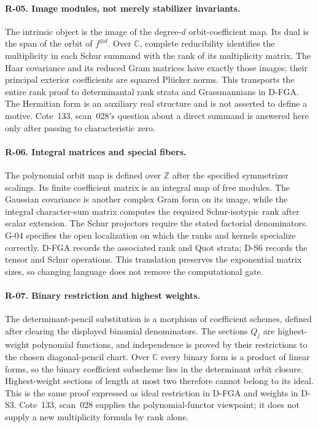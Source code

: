 \paragraph{R-05. Image modules, not merely stabilizer invariants.}
The intrinsic object is the image of the degree-$d$ orbit-coefficient map. Its dual is the span of the orbit of $f^{\otimes d}$. Over $\mathbb C$, complete reducibility identifies the multiplicity in each Schur summand with the rank of its multiplicity matrix. The Haar covariance and its reduced Gram matrices have exactly those images; their principal exterior coefficients are squared Pl\"ucker norms. This transports the entire rank proof to determinantal rank strata and Grassmannians in D-FGA. The Hermitian form is an auxiliary real structure and is not asserted to define a motive. Cote~133, scan~028's question about a direct summand is answered here only after passing to characteristic zero.

\paragraph{R-06. Integral matrices and special fibers.}
The polynomial orbit map is defined over $\mathbb Z$ after the specified symmetrizer scalings. Its finite coefficient matrix is an integral map of free modules. The Gaussian covariance is another complex Gram form on its image, while the integral character-sum matrix computes the required Schur-isotypic rank after scalar extension. The Schur projectors require the stated factorial denominators. G-04 specifies the open localization on which the ranks and kernels specialize correctly. D-FGA records the associated rank and Quot strata; D-S6 records the tensor and Schur operations. This translation preserves the exponential matrix sizes, so changing language does not remove the computational gate.

\paragraph{R-07. Binary restriction and highest weights.}
The determinant-pencil substitution is a morphism of coefficient schemes, defined after clearing the displayed binomial denominators. The sections $Q_j$ are highest-weight polynomial functions, and independence is proved by their restrictions to the chosen diagonal-pencil chart. Over $\mathbb C$ every binary form is a product of linear forms, so the binary coefficient subscheme lies in the determinant orbit closure. Highest-weight sections of length at most two therefore cannot belong to its ideal. This is the same proof expressed as ideal restriction in D-FGA and weights in D-S3. Cote~133, scan~028 supplies the polynomial-functor viewpoint; it does not supply a new multiplicity formula by rank alone.

